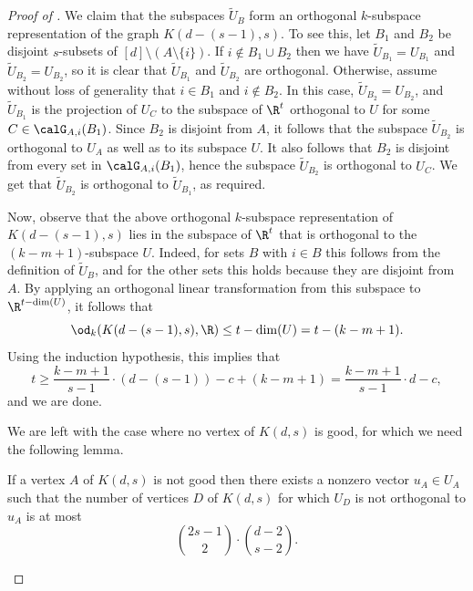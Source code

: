 \begin{proof}[Proof of ]
We claim that the subspaces $\widetilde{U}_B$ form an orthogonal $k$-subspace representation of the graph $K(d-(s-1),s)$.
To see this, let $B_1$ and $B_2$ be disjoint $s$-subsets of $[d] \setminus (A \setminus \{i\})$.
If $i \notin B_1 \cup B_2$ then we have $\widetilde{U}_{B_1} = U_{B_1}$ and $\widetilde{U}_{B_2} = U_{B_2}$, so it is clear that $\widetilde{U}_{B_1}$ and $\widetilde{U}_{B_2}$ are orthogonal. Otherwise, assume without loss of generality that $i \in B_1$ and $i \notin B_2$. In this case, $\widetilde{U}_{B_2} = U_{B_2}$, and $\widetilde{U}_{B_1}$ is the projection of $U_C$ to the subspace of $\R^t$ orthogonal to $U$ for some $C \in \calG_{A,i}(B_1)$.
Since $B_2$ is disjoint from $A$, it follows that the subspace $\widetilde{U}_{B_2}$ is orthogonal to $U_A$ as well as to its subspace $U$.
It also follows that $B_2$ is disjoint from every set in $\calG_{A,i}(B_1)$, hence the subspace $\widetilde{U}_{B_2}$ is orthogonal to $U_C$. We get that $\widetilde{U}_{B_2}$ is orthogonal to $\widetilde{U}_{B_1}$, as required.

Now, observe that the above orthogonal $k$-subspace representation of $K(d-(s-1),s)$ lies in the subspace of $\R^t$ that is orthogonal to the $(k-m+1)$-subspace $U$.
Indeed, for sets $B$ with $i \in B$ this follows from the definition of $\widetilde{U}_{B}$, and for the other sets this holds because they are disjoint from $A$.
By applying an orthogonal linear transformation from this subspace to $\R^{t-\dim(U)}$, it follows that \[\od_{k}(K(d-(s-1),s),\R) \leq t-\dim(U) = t-(k-m+1).\]
Using the induction hypothesis, this implies that
\[t \geq \frac{k-m+1}{s-1} \cdot (d-(s-1)) -c + (k-m+1)= \frac{k-m+1}{s-1} \cdot d-c,\]
and we are done.

We are left with the case where no vertex of $K(d,s)$ is good, for which we need the following lemma.

\begin{lemma}\label{lemma:bad_vertex}
If a vertex $A$ of $K(d,s)$ is not good then there exists a nonzero vector $u_A \in U_A$ such that the number of vertices $D$ of $K(d,s)$ for which $U_D$ is not orthogonal to $u_A$ is at most
\[\binom{2s-1}{2} \cdot \binom{d-2}{s-2}.\]
\end{lemma}


\end{proof}
